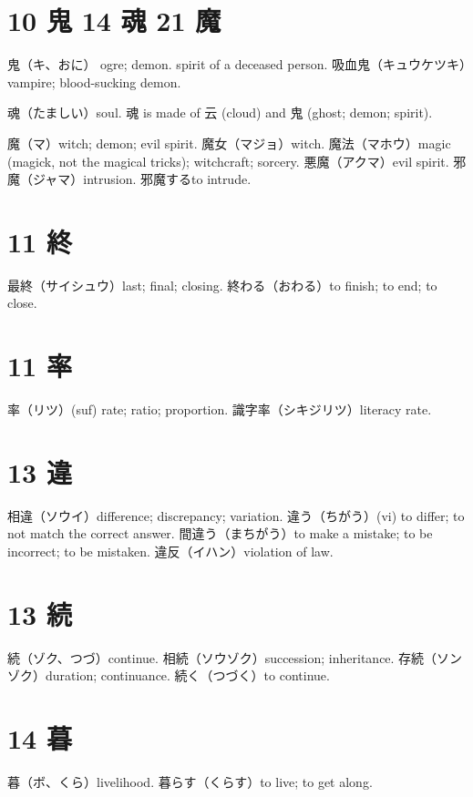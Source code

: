 \section{10 鬼 14 魂 21 魔}

鬼（キ、おに）
ogre; demon.
spirit of a deceased person.
吸血鬼（キュウケツキ）vampire; blood-sucking demon.

魂（たましい）soul.
魂 is made of 云 (cloud) and 鬼 (ghost; demon; spirit).

魔（マ）witch; demon; evil spirit.
魔女（マジョ）witch.
魔法（マホウ）magic (magick, not the magical tricks); witchcraft; sorcery.
悪魔（アクマ）evil spirit.
邪魔（ジャマ）intrusion.
邪魔するto intrude.

\section{11 終}

最終（サイシュウ）last; final; closing.
終わる（おわる）to finish; to end; to close.

\section{11 率}

率（リツ）(suf) rate; ratio; proportion.
識字率（シキジリツ）literacy rate.

\section{13 違}

相違（ソウイ）difference; discrepancy; variation.
違う（ちがう）(vi) to differ; to not match the correct answer.
間違う（まちがう）to make a mistake; to be incorrect; to be mistaken.
違反（イハン）violation of law.

\section{13 続}

続（ゾク、つづ）continue.
相続（ソウゾク）succession; inheritance.
存続（ソンゾク）duration; continuance.
続く（つづく）to continue.

\section{14 暮}

暮（ボ、くら）livelihood.
暮らす（くらす）to live; to get along.

